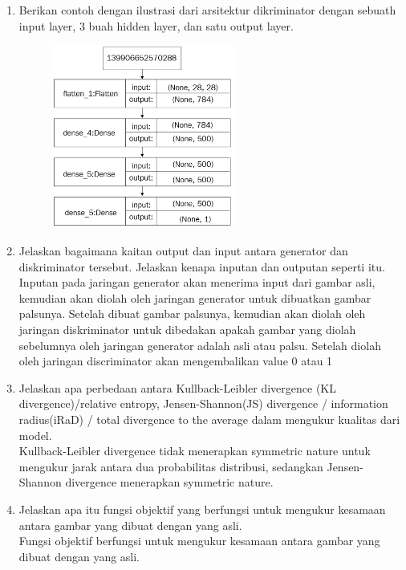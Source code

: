 \begin{enumerate}
\begin{figure}[H]
    	\centering
    \end{figure}
    \item Berikan contoh dengan ilustrasi dari arsitektur dikriminator dengan sebuath input layer, 3 buah hidden layer, dan satu output layer.
    \begin{figure}[H]
    	\includegraphics[width=6cm]{figures/1174006/chapter8/teori/arc2.png}
    	\centering
    \end{figure}
    \item Jelaskan bagaimana kaitan output dan input antara generator dan diskriminator tersebut. Jelaskan kenapa inputan dan outputan seperti itu.\\
    Inputan pada jaringan generator akan menerima input dari gambar asli, kemudian akan diolah oleh jaringan generator untuk dibuatkan gambar palsunya. Setelah dibuat gambar palsunya, kemudian akan diolah oleh jaringan diskriminator untuk dibedakan apakah gambar yang diolah sebelumnya oleh jaringan generator adalah asli atau palsu. Setelah diolah oleh jaringan discriminator akan mengembalikan value 0 atau 1
    
    \item Jelaskan apa perbedaan antara Kullback-Leibler divergence (KL divergence)/relative entropy, Jensen-Shannon(JS) divergence / information radius(iRaD) / total divergence to the average dalam mengukur kualitas dari model.\\
    Kullback-Leibler divergence tidak menerapkan symmetric nature untuk mengukur jarak antara dua probabilitas distribusi, sedangkan Jensen-Shannon divergence menerapkan symmetric nature.
    
    
    \item Jelaskan apa itu fungsi objektif yang berfungsi untuk mengukur kesamaan antara gambar yang dibuat dengan yang asli.\\
    Fungsi objektif berfungsi untuk mengukur kesamaan antara gambar yang dibuat dengan yang asli.
    

\end{enumerate}
